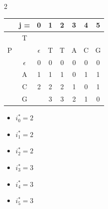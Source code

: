 \begin{multicols}{2}

    \begin{center}
        \begin{tabular}{|c c|c|c|c|c|c|c|} \hline
        &   j =     &  0            &   1   &   2   &   3   &   4   &   5   \\ \hline
        &   T       &               &       &       &       &       &       \\
        P   &       &  $\epsilon$   &   T   &   T   &   A   &   C   &   G   \\ \hline
        & $\epsilon$&       0       &0      &  0    & 0     &  0    &  0  \\ \hline
        &    A      &       1       &   1   &  1    & 0     & 1     &  1     \\ \hline
        &    C      &   2           &   2   &   2   &  1    & 0     &    1   \\ \hline
        &    G      &               &3      &  3    & 2     &  1    &  0     \\ \hline
        \end{tabular}
    \end{center}
    \columnbreak
    \begin{itemize}
        \item $i_0^\ast = 2$
        \item $i_1^\ast = 2 $
        \item $i_2^\ast = 2 $
        \item $i_3^\ast = 3$
        \item $i_4^\ast = 3$
        \item $i_5^\ast = 3$
    \end{itemize}
\end{multicols}